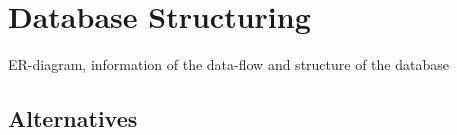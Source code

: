 \section{Database Structuring}
\label{sec:datstruct}

ER-diagram, information of the data-flow and structure of the database

\subsection{Alternatives}
\label{subsec:dsalt}
